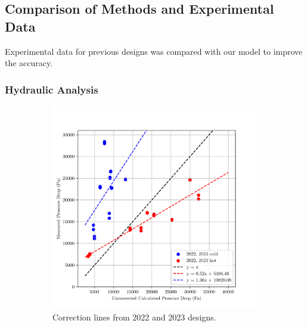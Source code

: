 \documentclass{article}
\begin{document}
\subsection{Comparison of Methods and Experimental Data}

Experimental data for previous designs was compared with our model to improve the accuracy.

\subsubsection{Hydraulic Analysis}

\begin{figure}[H]
  \centering
  \begin{subfigure}{.49\textwidth}
    \centering
    \includegraphics[width=0.99\textwidth]{dp_ucalc_vs_meas.png}
    \caption{Correction lines from 2022 and 2023 designs.}
    \label{fig:uncorrected_pressure_drops}
  \end{subfigure}
  \begin{subfigure}{.49\textwidth}
    \centering

\end{subfigure}
\end{figure}
\end{document}
